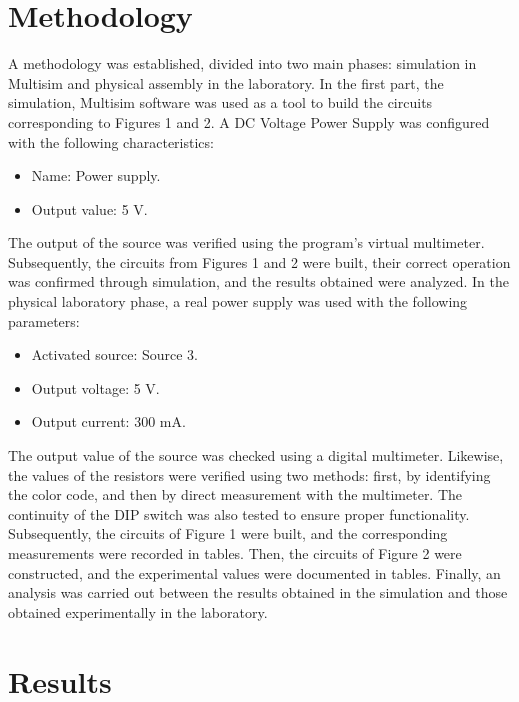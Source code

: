 \documentclass[12pt]{article}  %
\begin{document}
\section{Methodology} %
A methodology was established, divided into two main phases: simulation in Multisim and physical assembly in the laboratory.
In the first part, the simulation, Multisim software was used as a tool to build the circuits corresponding to Figures 1 and 2. A DC Voltage Power Supply was configured with the following characteristics:
\begin{itemize}
  \item Name: Power supply.
  \item Output value: 5 V.
\end{itemize}
The output of the source was verified using the program’s virtual multimeter. Subsequently, the circuits from Figures 1 and 2 were built, their correct operation was confirmed through simulation, and the results obtained were analyzed.
In the physical laboratory phase, a real power supply was used with the following parameters:
\begin{itemize}
  \item Activated source: Source 3.
  \item Output voltage: 5 V.
  \item Output current: 300 mA.
\end{itemize}
The output value of the source was checked using a digital multimeter. Likewise, the values of the resistors were verified using two methods: first, by identifying the color code, and then by direct measurement with the multimeter. The continuity of the DIP switch was also tested to ensure proper functionality.
Subsequently, the circuits of Figure 1 were built, and the corresponding measurements were recorded in tables. Then, the circuits of Figure 2 were constructed, and the experimental values were documented in tables.
Finally, an analysis was carried out between the results obtained in the simulation and those obtained experimentally in the laboratory.

\section{Results} %
\end{document}
